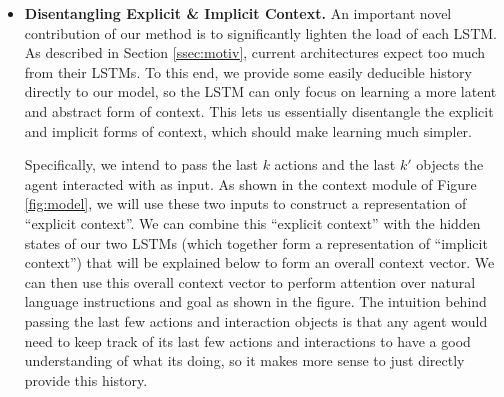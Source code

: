 \documentclass[11pt,a4paper]{article}
\begin{document}
\begin{itemize}
    \item \textbf{Disentangling Explicit \& Implicit Context.} An important novel contribution of our method is to significantly lighten the load of each LSTM. As described in Section \ref{ssec:motiv}, current architectures expect too much from their LSTMs. To this end, we provide some easily deducible history directly to our model, so the LSTM can only focus on learning a more latent and abstract form of context. This lets us essentially disentangle the explicit and implicit forms of context, which should make learning much simpler.

    Specifically, we intend to pass the last $k$ actions and the last $k'$ objects the agent interacted with as input.  As shown in the context module of Figure \ref{fig:model}, we will use these two inputs to construct a representation of ``explicit context''. We can combine this ``explicit context'' with the hidden states of our two LSTMs (which together form a representation of ``implicit context'') that will be explained below to form an overall context vector. We can then use this overall context vector to perform attention over natural language instructions and goal as shown in the figure.  The intuition behind passing the last few actions and interaction objects is that any agent would need to keep track of its last few actions and interactions to have a good understanding of what its doing, so it makes more sense to just directly provide this history.


\end{itemize}
\end{document}
